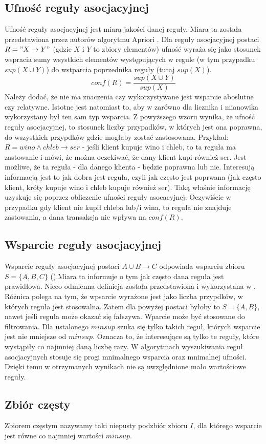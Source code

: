 \subsection{Ufność reguły asocjacyjnej}
\label{c224}
Ufność reguły asocjacyjnej jest miarą jakości danej reguły. Miara ta została przedstawiona przez autorów algorytmu Apriori \cite{Agrawal1994}. Dla reguły asocjacyjnej postaci \(R = "X\rightarrow Y"\) (gdzie \(X\) i \(Y\) to zbiory elementów) ufność wyraża się jako stosunek wspracia sumy wsystkich elementów występujących w regule (w tym przypadku \(sup(X \cup Y)\)) do wstparcia poprzednika reguły (tutaj \(sup(X)\)). 
\[conf(R) = \frac{sup(X \cup Y)}{sup(X)}\]
Należy dodać, że nie ma znaczenia czy wykorzystywane jest wsparcie aboslutne czy relatywne. Istotne jest natomiast to, aby w zarówno dla licznika i mianowika wykorzystany był ten sam typ wsparcia.
Z powyższego wzoru wynika, że ufność reguły asocjacyjnej, to stosunek liczby przypadków, w których jest ona poprawna, do wszystkich przypdków gdzie mogłaby zostać zastosowana.
Przykład: \(R = wino \wedge chleb \rightarrow ser\) - jeśli klient kupuje wino i chleb, to ta reguła ma zastowanie i mówi, że można oczekiwać, że dany klient kupi również ser. Jest możliwe, że ta reguła - dla danego klienta - będzie poprawna lub nie. Interesują informacją jest to jak dobra jest reguła, czyli jak często jest poprwana (jak często klient, króty kupuje wino i chleb kupuje również ser). Taką właśnie informację uzyskuje się poprzez obliczenie ufności reguły asocacyjnej. Oczywiście w przypadku gdy klient nie kupił chleba lub/i wina, to reguła nie znajduje zastowania, a dana transakcja nie wpływa na \(conf(R)\). 

\subsection{Wsparcie reguły asocjacyjnej}
\label{c225}
Wsparcie reguły asocjacyjnej postaci \(A \cup B \rightarrow C\) odpowiada wsparciu zbioru \(S = \{A, B, C\}\) (\cite{Agrawal}).Miara ta informuje o tym jak często dana reguła jest prawidłowa. Nieco odmienna definicja została przedstawiona i wykorzystana w \cite{Borgelt}. Różnica polega na tym, że wpsarcie wyrażone jest jako liczba przypdków, w których reguła jest stosowalna. Zatem dla powyżej postaci byłoby to \(S = \{A, B\}\), nawet jeśli reguła może okazać się fałszywa. 
Wparcie może być stosowane do filtrowania. Dla ustalonego \(minsup\) szuka się tylko takich reguł, których wsparcie jest nie mniejsze od \(minsup\). Oznacza to, że interesujące są tylko te reguły, które wystąpiły co najmniej daną liczbę razy.
W algorytmach wyszukiwania reguł asocjacyjnych stosuje się progi mnimalnego wsparcia oraz mnimalnej ufności. Dzięki temu w otrzymanych wynikach nie są uwzględnione mało wartościowe reguły.

\subsection{Zbiór częsty}
\label{c226}
Zbiorem częstym nazywamy taki niepusty podzbiór zbioru \(I\), dla którego wsparcie jest równe co najmniej wartości \(minsup\).
